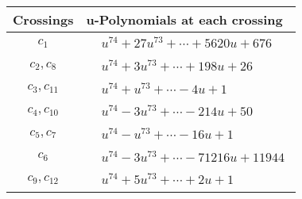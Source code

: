 \documentclass[1p]{elsarticle_modified}
\theoremstyle{definition}
\begin{document}
\begin{tabular}{m{50pt}|m{274pt}}
Crossings & \hspace{64pt}u-Polynomials at each crossing \\
\hline $$\begin{aligned}c_{1}\end{aligned}$$&$\begin{aligned}
&u^{74}+27 u^{73}+\cdots+5620 u+676
\end{aligned}$\\
\hline $$\begin{aligned}c_{2},c_{8}\end{aligned}$$&$\begin{aligned}
&u^{74}+3 u^{73}+\cdots+198 u+26
\end{aligned}$\\
\hline $$\begin{aligned}c_{3},c_{11}\end{aligned}$$&$\begin{aligned}
&u^{74}+u^{73}+\cdots-4 u+1
\end{aligned}$\\
\hline $$\begin{aligned}c_{4},c_{10}\end{aligned}$$&$\begin{aligned}
&u^{74}-3 u^{73}+\cdots-214 u+50
\end{aligned}$\\
\hline $$\begin{aligned}c_{5},c_{7}\end{aligned}$$&$\begin{aligned}
&u^{74}- u^{73}+\cdots-16 u+1
\end{aligned}$\\
\hline $$\begin{aligned}c_{6}\end{aligned}$$&$\begin{aligned}
&u^{74}-3 u^{73}+\cdots-71216 u+11944
\end{aligned}$\\
\hline $$\begin{aligned}c_{9},c_{12}\end{aligned}$$&$\begin{aligned}
&u^{74}+5 u^{73}+\cdots+2 u+1
\end{aligned}$\\
\hline
\end{tabular}\\~\\
\newpage\renewcommand{\arraystretch}{1}
\end{document}
